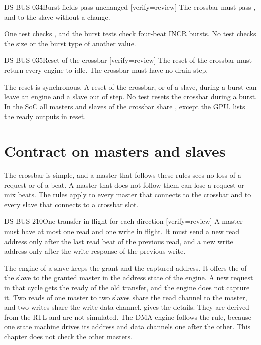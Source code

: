 \begin{requirement}{DS-BUS-034}{Burst fields pass unchanged}
[verify={review}]
The crossbar must pass ,  and  to the slave without a change.
\end{requirement}
\begin{information}
One test checks , and the burst tests check four-beat INCR bursts. No test checks the size or the burst type of another value.
\end{information}

\begin{requirement}{DS-BUS-035}{Reset of the crossbar}
[verify={review}]
The reset of the crossbar must return every engine to idle. The crossbar must have no drain step.
\end{requirement}
\begin{information}
The reset is synchronous. A reset of the crossbar, or of a slave, during a burst can leave an engine and a slave out of step. No test resets the crossbar during a burst. In the SoC all masters and slaves of the crossbar share , except the GPU.  lists the ready outputs in reset.
\end{information}

\section{Contract on masters and slaves}\label{ds:ch:mod-bus-fabric:contract}
The crossbar is simple, and a master that follows these rules sees no loss of a request or of a beat. A master that does not follow them can lose a request or mix beats. The rules apply to every master that connects to the crossbar and to every slave that connects to a crossbar slot.

\begin{requirement}{DS-BUS-210}{One transfer in flight for each direction}
[verify={review}]
A master must have at most one read and one write in flight. It must send a new read address only after the last read beat of the previous read, and a new write address only after the write response of the previous write.
\end{requirement}
\begin{information}
The engine of a slave keeps the grant and the captured address. It offers the  of the slave to the granted master in the address state of the engine. A new request in that cycle gets the ready of the old transfer, and the engine does not capture it. Two reads of one master to two slaves share the read channel to the master, and two writes share the write data channel.  gives the details. They are derived from the RTL and are not simulated. The DMA engine follows the rule, because one state machine drives its address and data channels one after the other. This chapter does not check the other masters.
\end{information}

